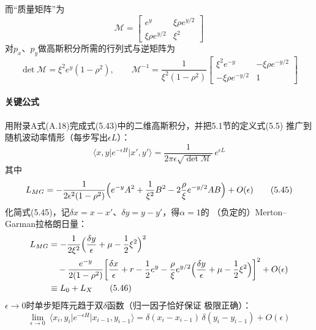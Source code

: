 而“质量矩阵”为
\begin{equation*}
\mathcal{M}=\begin{bmatrix}
e^{y} & \xi\rho e^{y/2}\\
\xi\rho e^{y/2} & \xi^{2}
\end{bmatrix}
\end{equation*}
对$p_{x}$、$p_{y}$做高斯积分所需的行列式与逆矩阵为
\begin{equation*}
\det\mathcal{M}=\xi^{2}e^{y}(1-\rho^{2}),\qquad
\mathcal{M}^{-1}=\frac{1}{\xi^{2}(1-\rho^{2})}
\begin{bmatrix}
\xi^{2}e^{-y} & -\xi\rho e^{-y/2}\\
-\xi\rho e^{-y/2} & 1
\end{bmatrix}
\end{equation*}

\paragraph{关键公式}
用附录A式(A.18)完成式(5.43)中的二维高斯积分，并把5.1节的定义式(5.5)
推广到随机波动率情形（每步写出$\epsilon L$）：
\begin{equation*}
\langle x,y\vert e^{-\epsilon H}\vert x',y'\rangle
=\frac{1}{2\pi\epsilon\sqrt{\det\mathcal{M}}}\,e^{\epsilon L}
\tag{5.44}
\end{equation*}
其中
\begin{equation*}
L_{MG}=-\frac{1}{2\epsilon^{2}(1-\rho^{2})}
\Bigl(e^{-y}A^{2}+\frac{1}{\xi^{2}}B^{2}
-2\frac{\rho}{\xi}e^{-y/2}AB\Bigr)+O(\epsilon)
\tag{5.45}
\end{equation*}
化简式(5.45)，记$\delta x=x-x'$、$\delta y=y-y'$，得$\alpha=1$的
（负定的）Merton--Garman拉格朗日量：
\begin{align*}
L_{MG}&=-\frac{1}{2\xi^{2}}\Bigl(\frac{\delta y}{\epsilon}
+\mu-\frac{1}{2}\xi^{2}\Bigr)^{2}\\
&\quad-\frac{e^{-y}}{2(1-\rho^{2})}
\biggl[\frac{\delta x}{\epsilon}+r-\frac{1}{2}e^{y}
-\frac{\rho}{\xi}e^{y/2}\Bigl(\frac{\delta y}{\epsilon}
+\mu-\frac{1}{2}\xi^{2}\Bigr)\biggr]^{2}+O(\epsilon)\\
&\equiv L_{0}+L_{X}
\tag{5.46}
\end{align*}
$\epsilon\to0$时单步矩阵元趋于双$\delta$函数（归一因子恰好保证
极限正确）：
\begin{equation*}
\lim_{\epsilon\to0}\ \langle x_{i},y_{i}\vert e^{-\epsilon H}\vert
x_{i-1},y_{i-1}\rangle
=\delta(x_{i}-x_{i-1})\,\delta(y_{i}-y_{i-1})+O(\epsilon)
\tag{5.47}
\end{equation*}
